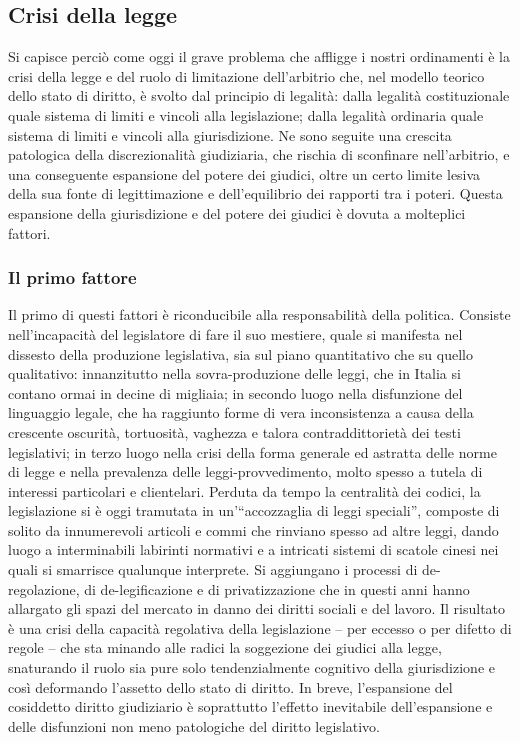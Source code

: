 \subsection{Crisi della legge}
Si capisce perciò come oggi il grave problema che affligge i nostri ordinamenti è la crisi della legge e del ruolo di limitazione dell’arbitrio che, nel modello teorico dello stato di diritto, è svolto dal principio di legalità: dalla legalità costituzionale quale sistema di limiti e vincoli alla legislazione; dalla legalità ordinaria quale sistema di limiti e vincoli alla giurisdizione. Ne sono seguite una crescita patologica della discrezionalità giudiziaria, che rischia di sconfinare nell’arbitrio, e una conseguente espansione del potere dei giudici, oltre un certo limite lesiva della sua fonte di legittimazione e dell’equilibrio dei rapporti tra i poteri. Questa espansione della giurisdizione e del potere dei giudici è dovuta a molteplici fattori.
\subsubsection{Il primo fattore}
Il primo di questi fattori è riconducibile alla responsabilità della politica. Consiste nell’incapacità del legislatore di fare il suo mestiere, quale si manifesta nel dissesto della produzione legislativa, sia sul piano quantitativo che su quello qualitativo: innanzitutto nella sovra-produzione delle leggi, che in Italia si contano ormai in decine di migliaia; in secondo luogo nella disfunzione del linguaggio legale, che ha raggiunto forme di vera inconsistenza a causa della crescente oscurità, tortuosità, vaghezza e talora contraddittorietà dei testi legislativi; in terzo luogo nella crisi della forma generale ed astratta delle norme di legge e nella prevalenza delle leggi-provvedimento, molto spesso a tutela di interessi particolari e clientelari. Perduta da tempo la centralità dei codici, la legislazione si è oggi tramutata in un’“accozzaglia di leggi speciali”, composte di solito da innumerevoli articoli e commi che rinviano spesso ad altre leggi, dando luogo a interminabili labirinti normativi e a intricati sistemi di scatole cinesi nei quali si smarrisce qualunque interprete. Si aggiungano i processi di de-regolazione, di de-legificazione e di privatizzazione che in questi anni hanno allargato gli spazi del mercato in danno dei diritti sociali e del lavoro. Il risultato è una crisi della capacità regolativa della legislazione – per eccesso o per difetto di regole – che sta minando alle radici la soggezione dei giudici alla legge, snaturando il ruolo sia pure solo tendenzialmente cognitivo della giurisdizione e così deformando l’assetto dello stato di diritto. In breve, l’espansione del cosiddetto diritto giudiziario è soprattutto l’effetto inevitabile dell’espansione e delle disfunzioni non meno patologiche del diritto legislativo.

